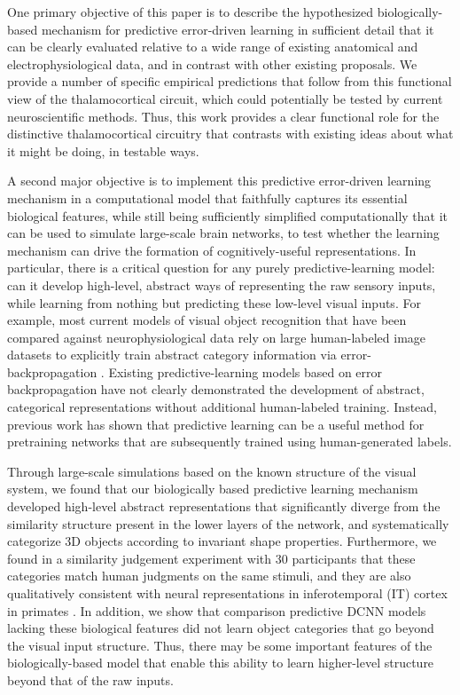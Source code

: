 \documentclass[11pt,twoside]{article}
\newif\myifpdf
\begin{document}
One primary objective of this paper is to describe the hypothesized biologically-based mechanism for predictive error-driven learning in sufficient detail that it can be clearly evaluated relative to a wide range of existing anatomical and electrophysiological data, and in contrast with other existing proposals.  We provide a number of specific empirical predictions that follow from this functional view of the thalamocortical circuit, which could potentially be tested by current neuroscientific methods.  Thus, this work provides a clear functional role for the distinctive thalamocortical circuitry that contrasts with existing ideas about what it might be doing, in testable ways.

A second major objective is to implement this predictive error-driven learning mechanism in a computational model that faithfully captures its essential biological features, while still being sufficiently simplified computationally that it can be used to simulate large-scale brain networks, to test whether the learning mechanism can drive the formation of cognitively-useful representations.  In particular, there is a critical question for any purely predictive-learning model: can it develop high-level, abstract ways of representing the raw sensory inputs, while learning from nothing but predicting these low-level visual inputs.  For example, most current models of visual object recognition that have been compared against neurophysiological data rely on large human-labeled image datasets to explicitly train abstract category information via error-backpropagation \citep{CadieuHongYaminsEtAl14,RajalinghamIssaBashivanEtAl18}.  Existing predictive-learning models based on error backpropagation \citep{LotterKreimanCox16} have not clearly demonstrated the development of abstract, categorical representations without additional human-labeled training.  Instead, previous work has shown that predictive learning can be a useful method for pretraining networks that are subsequently trained using human-generated labels.

Through large-scale simulations based on the known structure of the visual system, we found that our biologically based predictive learning mechanism developed high-level abstract representations that significantly diverge from the similarity structure present in the lower layers of the network, and systematically categorize 3D objects according to invariant shape properties.  Furthermore, we found in a similarity judgement experiment with 30  participants that these categories match human judgments on the same stimuli, and they are also qualitatively consistent with neural representations in inferotemporal (IT) cortex in primates \citep{CadieuHongYaminsEtAl14}.  In addition, we show that comparison predictive DCNN models lacking these biological features \citep{LotterKreimanCox16} did not learn object categories that go beyond the visual input structure.  Thus, there may be some important features of the biologically-based model that enable this ability to learn higher-level structure beyond that of the raw inputs.
\end{document}
